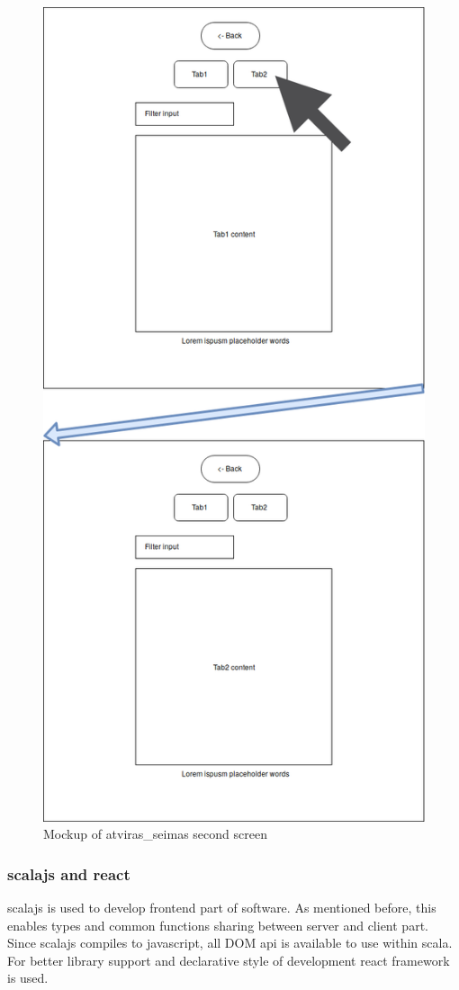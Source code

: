 \documentclass[a4paper,12pt]{article}
\begin{document}
	\begin{figure}[H]	
		\centering
		\includegraphics[width=11.5cm]{images/frontend_mockup_crop_2.png}
		\caption{Mockup of \gls{atviras_seimas} second screen}
		\label{fig:frontend_mockup_2}
	\end{figure}

	\subsubsection{\Gls{scalajs} and \gls{react}}
	\Gls{scalajs} is used to develop frontend part of software. As mentioned before, this enables types and common functions sharing between server and client part. Since \gls{scalajs} compiles to \gls{javascript}, all DOM \acrshort{api} is available to use within \Gls{scala}. For better library support and declarative style of development \gls{react} framework is used. 
	
\end{document}
